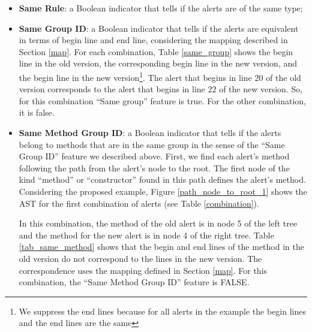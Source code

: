 \documentclass[
]{article}
\begin{document}
\begin{itemize}
\item \textbf{Same Rule}: a Boolean indicator that tells if the alerts are of the same type;

\item \textbf{Same Group ID}: a Boolean indicator that tells if the alerts are equivalent 
in terms of begin line and end line, considering the mapping described in Section
\ref{map}. For each combination, Table \ref{same_group} shows the begin line in the
old version, the corresponding begin line in the new version, and the begin line in
the new version\footnote{We suppress the end lines because for all alerts in the 
example the begin lines and the end lines are the same}. The alert that begins in 
line 20 of the old version corresponds to the alert that begins in line 22 of the
new version. So, for this combination ``Same group'' feature is true. For the
other combination, it is false.

\small
\begin{table}[H]
\caption{\label{tab:unnamed-chunk-7}Same group feature \label{same_group}}
\centering
{}
\end{table}

\normalsize

\noindent
\item \textbf{Same Method Group ID}: a Boolean indicator that tells if the alerts belong to 
methods that are in the same group in the sense of the ``Same Group ID'' feature we
described above. First, we find each alert's method following the path from the alert's 
node to the root. The first node of the kind ``method'' or ``constructor'' found
in this path defines the alert's method. Considering the proposed example, Figure 
\ref{path_node_to_root_1} shows the AST for the first combination of alerts (see 
Table \ref{combination}).

In this combination, the method of the old alert is in node 5 of the left tree and 
the method for the new alert is in node 4 of the right tree. Table \ref{tab_same_method}
shows that the begin and end lines of the method in the old version do not correspond 
to the lines in the new version. The correspondence uses the mapping defined in 
Section \ref{map}. For this combination, the ``Same Method Group ID'' feature is
FALSE.


\end{itemize}
\end{document}
